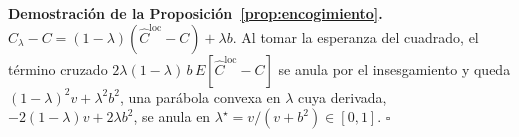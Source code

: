 \documentclass[pdflatex,sn-mathphys-num]{sn-jnl}
\theoremstyle{plain}
\begin{document}
\begin{appendices}
\textbf{Demostración de la Proposición~\ref{prop:encogimiento}.} $\hat{C}_\lambda-C=(1-\lambda)(\hat{C}^{\text{loc}}-C)+\lambda b$. Al tomar la esperanza del cuadrado, el término cruzado $2\lambda(1-\lambda)\,b\,E[\hat{C}^{\text{loc}}-C]$ se anula por el insesgamiento y queda $(1-\lambda)^2v+\lambda^2b^2$, una parábola convexa en $\lambda$ cuya derivada, $-2(1-\lambda)v+2\lambda b^2$, se anula en $\lambda^\star=v/(v+b^2)\in[0,1]$. \hfill$\square$

\end{appendices}


\end{document}
